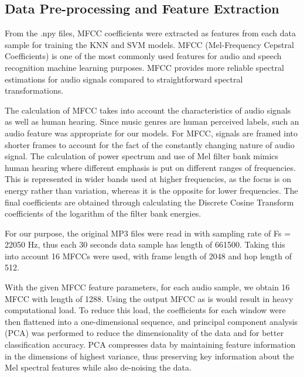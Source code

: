 \documentclass[letterpaper, 12 pt, conference]{ieeeconf}  %
\begin{document}

\subsection{Data Pre-processing and Feature Extraction}


From the .npy files, MFCC coefficients were extracted as features from each data sample for training the KNN and SVM models. MFCC (Mel-Frequency Cepstral Coefficients) is one of the most commonly used features for audio and speech recognition machine learning purposes. MFCC provides more reliable spectral estimations for audio signals compared to straightforward spectral transformations. 

The calculation of MFCC takes into account the characteristics of audio signals as well as human hearing. Since music genres are human perceived labels, such an audio feature was appropriate for our models. For MFCC, signals are framed into shorter frames to account for the fact of the constantly changing nature of audio signal. The calculation of power spectrum and use of Mel filter bank mimics human hearing where different emphasis is put on different ranges of frequencies. This is represented in wider bands used at higher frequencies, as the focus is on energy rather than variation, whereas it is the opposite for lower frequencies. The final coefficients are obtained through calculating the Discrete Cosine Transform coefficients of the logarithm of the filter bank energies. 

For our purpose, the original MP3 files were read in with sampling rate of Fs = 22050 Hz, thus each 30 seconds data sample has length of 661500. Taking this into account 16 MFCCs were used, with frame length of 2048 and hop length of 512. 

With the given MFCC feature parameters, for each audio sample, we obtain 16 MFCC with length of 1288. Using the output MFCC as is would result in heavy computational load. To reduce this load, the coefficients for each window were then flattened into a one-dimensional sequence, and principal component analysis (PCA) was performed to reduce the dimensionality of the data and for better classification accuracy. PCA compresses data by maintaining feature information in the dimensions of highest variance, thus preserving key information about the Mel spectral features while also de-noising the data.
\end{document}
